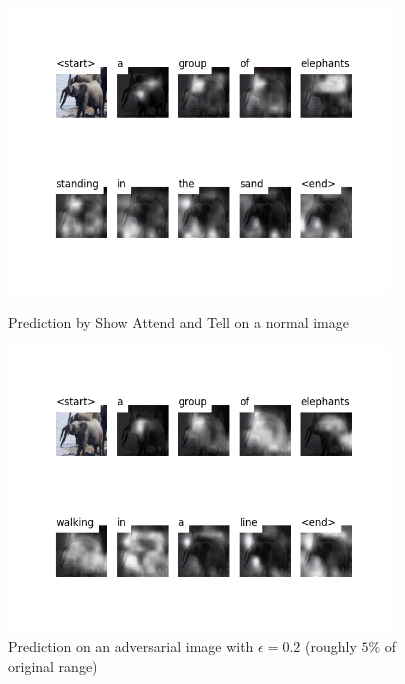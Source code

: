 \begin{figure}[ht]
    \centering
    \begin{minipage}{0.45\textwidth}
        \centering
        \includegraphics[width=0.9\textwidth]{figures/caption_elephant_normal.png} %
        \caption{Prediction by Show Attend and Tell on a normal image}
    \end{minipage}\hfill
    \begin{minipage}{0.45\textwidth}
        \centering
        \includegraphics[width=0.9\textwidth]{figures/caption_elephant_adversarial.png} %
        \caption{Prediction on an adversarial image with $\epsilon=0.2$ (roughly $5\%$ of original range)}
    \end{minipage}
\end{figure}